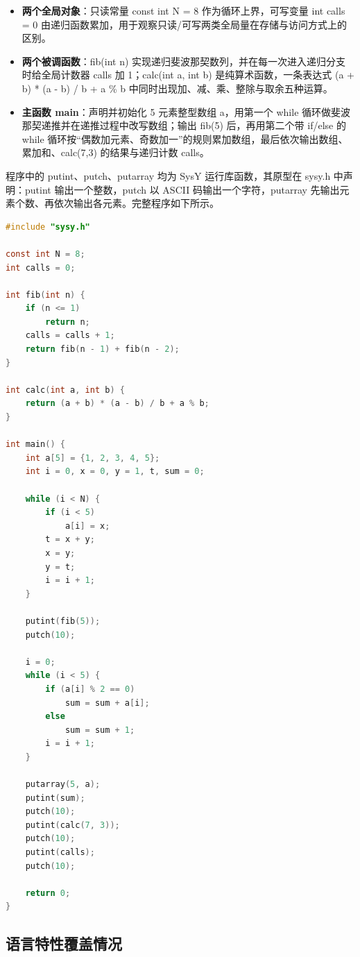 \documentclass[UTF8,a4paper,10pt]{ctexart}
\begin{document}
\begin{itemize}
  \item \textbf{两个全局对象}：只读常量 const int N = 8 作为循环上界，可写变量 int calls = 0 由递归函数累加，用于观察只读/可写两类全局量在存储与访问方式上的区别。
  \item \textbf{两个被调函数}：fib(int n) 实现递归斐波那契数列，并在每一次进入递归分支时给全局计数器 calls 加 1；calc(int a, int b) 是纯算术函数，一条表达式 (a + b) * (a - b) / b + a \% b 中同时出现加、减、乘、整除与取余五种运算。
  \item \textbf{主函数 main}：声明并初始化 5 元素整型数组 a，用第一个 while 循环做斐波那契递推并在递推过程中改写数组；输出 fib(5) 后，再用第二个带 if/else 的 while 循环按“偶数加元素、奇数加一”的规则累加数组，最后依次输出数组、累加和、calc(7,3) 的结果与递归计数 calls。
\end{itemize}

程序中的 putint、putch、putarray 均为 SysY 运行库函数，其原型在 sysy.h 中声明：putint 输出一个整数，putch 以 ASCII 码输出一个字符，putarray 先输出元素个数、再依次输出各元素。完整程序如下所示。

\begin{lstlisting}[language=C]
#include "sysy.h"

const int N = 8;
int calls = 0;

int fib(int n) {
    if (n <= 1)
        return n;
    calls = calls + 1;
    return fib(n - 1) + fib(n - 2);
}

int calc(int a, int b) {
    return (a + b) * (a - b) / b + a % b;
}

int main() {
    int a[5] = {1, 2, 3, 4, 5};
    int i = 0, x = 0, y = 1, t, sum = 0;

    while (i < N) {
        if (i < 5)
            a[i] = x;
        t = x + y;
        x = y;
        y = t;
        i = i + 1;
    }

    putint(fib(5));
    putch(10);

    i = 0;
    while (i < 5) {
        if (a[i] % 2 == 0)
            sum = sum + a[i];
        else
            sum = sum + 1;
        i = i + 1;
    }

    putarray(5, a);
    putint(sum);
    putch(10);
    putint(calc(7, 3));
    putch(10);
    putint(calls);
    putch(10);

    return 0;
}
\end{lstlisting}

\subsection{语言特性覆盖情况}
\end{document}

